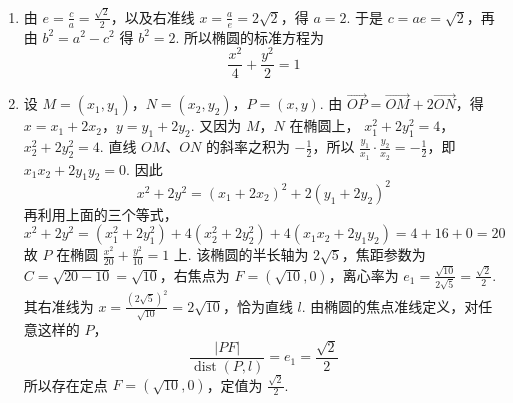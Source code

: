\begin{solution}
\begin{enumerate}
\item 由 \(e=\frac ca=\frac{\sqrt2}{2}\)，以及右准线 \(x=\frac ae=2\sqrt2\)，得
\(a=2\). 于是 \(c=ae=\sqrt2\)，再由 \(b^{2}=a^{2}-c^{2}\) 得 \(b^{2}=2\). 所以椭圆的标准方程为
\[
\frac{x^{2}}4+\frac{y^{2}}2=1
\]
\item 设 \(M=(x_{1},y_{1})\)，\(N=(x_{2},y_{2})\)，\(P=(x,y)\). 由
\(\overrightarrow{OP}=\overrightarrow{OM}+2\overrightarrow{ON}\)，得
\(x=x_{1}+2x_{2}\)，\(y=y_{1}+2y_{2}\). 又因为 \(M\)，\(N\) 在椭圆上，
\(x_{1}^{2}+2y_{1}^{2}=4\)，\(x_{2}^{2}+2y_{2}^{2}=4\).
直线 \(OM\)、\(ON\) 的斜率之积为 \(-\frac12\)，所以
\(\frac{y_{1}}{x_{1}}\cdot\frac{y_{2}}{x_{2}}=-\frac12\)，即
\(x_{1}x_{2}+2y_{1}y_{2}=0\). 因此
\[
x^{2}+2y^{2}=(x_{1}+2x_{2})^{2}+2(y_{1}+2y_{2})^{2}
\]
再利用上面的三个等式，
\[
x^{2}+2y^{2}=(x_{1}^{2}+2y_{1}^{2})+4(x_{2}^{2}+2y_{2}^{2})+4(x_{1}x_{2}+2y_{1}y_{2})=4+16+0=20
\]
故 \(P\) 在椭圆 \(\frac{x^{2}}{20}+\frac{y^{2}}{10}=1\) 上. 该椭圆的半长轴为 \(2\sqrt5\)，焦距参数为
\(C=\sqrt{20-10}=\sqrt{10}\)，右焦点为 \(F=(\sqrt{10},0)\)，离心率为
\(e_{1}=\frac{\sqrt{10}}{2\sqrt5}=\frac{\sqrt2}{2}\). 其右准线为
\(x=\frac{(2\sqrt5)^{2}}{\sqrt{10}}=2\sqrt{10}\)，恰为直线 \(l\). 由椭圆的焦点准线定义，对任意这样的 \(P\)，
\[
\frac{|PF|}{\operatorname{dist}(P,l)}=e_{1}=\frac{\sqrt2}{2}
\]
所以存在定点 \(F=(\sqrt{10},0)\)，定值为 \(\frac{\sqrt2}{2}\).
\end{enumerate}
\end{solution}
